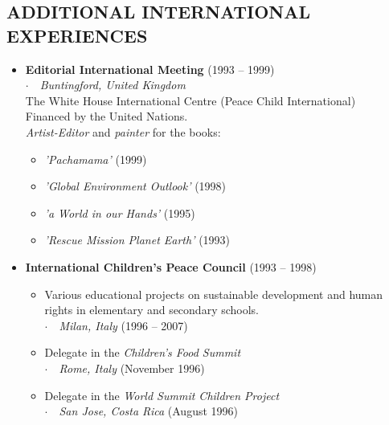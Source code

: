\documentclass[line,margin]{res}
\newcommand{\placestyle}[1]{\footnotesize $\cdot$\ \ {\emph{#1}}}
\newcommand{\datestyle}[1]{{\tiny \dotfill} {\small (#1)}}
\begin{document}
\begin{resume}
\section{ADDITIONAL INTERNATIONAL EXPERIENCES}
\begin{itemize}
\item {
  {\bf Editorial International Meeting} \datestyle{1993 -- 1999} \\
  { \placestyle{Buntingford, United Kingdom} } \\
  The White House International Centre (Peace Child International) \\
  Financed by the United Nations. \\
  \emph{Artist-Editor} and \emph{painter} for the books:
  \begin{itemize}
  \item \emph{'Pachamama'} \datestyle{1999}
  \item \emph{'Global Environment Outlook'} \datestyle{1998}
  \item \emph{'a World in our Hands'} \datestyle{1995}
  \item \emph{'Rescue Mission Planet Earth'} \datestyle{1993}
  \end{itemize}
}
\item {
  {\bf International Children's Peace Council} \datestyle{1993 -- 1998}
  \begin{itemize}
  \item \raggedright Various educational projects on sustainable development and human rights in elementary and secondary schools. \\
    { \placestyle{Milan, Italy} \datestyle{1996 -- 2007} }
  \item Delegate in the \emph{Children's Food Summit} \\
    { \placestyle{Rome, Italy} \datestyle{November 1996} }
  \item Delegate in the \emph{World Summit Children Project} \\
    { \placestyle{San Jose, Costa Rica} \datestyle{August 1996} }
  \end{itemize}
}
\end{itemize}

\newpage

\end{resume}
\end{document}
